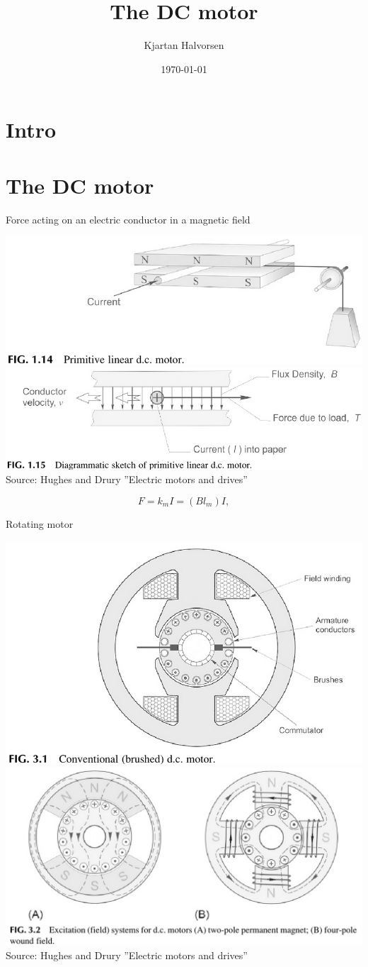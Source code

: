 \documentclass[presentation,aspectratio=169]{beamer}
\author{Kjartan Halvorsen}
\date{\today}
\title{The DC motor}
\begin{document}
\maketitle

\section{Intro}
\label{sec:org1ac59b1}

\section{The DC motor}
\label{sec:org49f77d8}
\begin{frame}[label={sec:orgf50b351}]{Force acting on an electric conductor in a magnetic field}
\begin{center}
\includegraphics[width=0.4\linewidth]{../../figures/HD-fig1_14.png}
\includegraphics[width=0.53\linewidth]{../../figures/HD-fig1_15.png}
\footnotesize Source: Hughes and Drury ''Electric motors and drives''
\end{center}

\[F=k_mI=(Bl_m)I,\]
\end{frame}

\begin{frame}[label={sec:org479f6d4}]{Rotating motor}
\begin{center}
\includegraphics[width=0.4\linewidth]{../../figures/HD-fig3_1.png}
\includegraphics[width=0.53\linewidth]{../../figures/HD-fig3_2.png}
{\footnotesize Source: Hughes and Drury ''Electric motors and drives''}
\end{center}
\end{frame}
\end{document}
